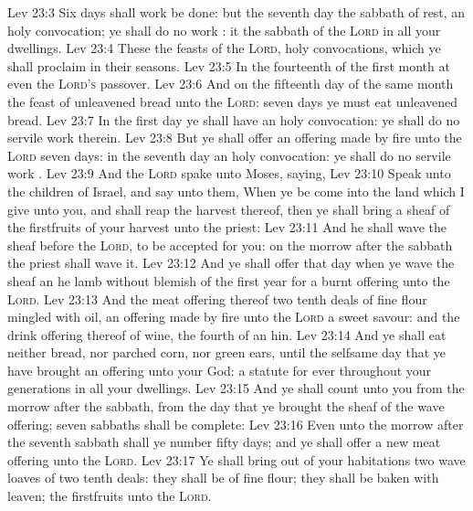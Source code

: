 \vs Lev 23:3 Six days shall work be done: but the seventh day  the sabbath of rest, an holy convocation; ye shall do no work : it  the sabbath of the \textsc{Lord} in all your dwellings.
\vs Lev 23:4 These  the feasts of the \textsc{Lord},  holy convocations, which ye shall proclaim in their seasons.
\vs Lev 23:5 In the fourteenth  of the first month at even  the \textsc{Lord's} passover.
\vs Lev 23:6 And on the fifteenth day of the same month  the feast of unleavened bread unto the \textsc{Lord}: seven days ye must eat unleavened bread.
\vs Lev 23:7 In the first day ye shall have an holy convocation: ye shall do no servile work therein.
\vs Lev 23:8 But ye shall offer an offering made by fire unto the \textsc{Lord} seven days: in the seventh day  an holy convocation: ye shall do no servile work .
\vs Lev 23:9 And the \textsc{Lord} spake unto Moses, saying,
\vs Lev 23:10 Speak unto the children of Israel, and say unto them, When ye be come into the land which I give unto you, and shall reap the harvest thereof, then ye shall bring a sheaf of the firstfruits of your harvest unto the priest:
\vs Lev 23:11 And he shall wave the sheaf before the \textsc{Lord}, to be accepted for you: on the morrow after the sabbath the priest shall wave it.
\vs Lev 23:12 And ye shall offer that day when ye wave the sheaf an he lamb without blemish of the first year for a burnt offering unto the \textsc{Lord}.
\vs Lev 23:13 And the meat offering thereof  two tenth deals of fine flour mingled with oil, an offering made by fire unto the \textsc{Lord}  a sweet savour: and the drink offering thereof  of wine, the fourth  of an hin.
\vs Lev 23:14 And ye shall eat neither bread, nor parched corn, nor green ears, until the selfsame day that ye have brought an offering unto your God:  a statute for ever throughout your generations in all your dwellings.
\vs Lev 23:15 And ye shall count unto you from the morrow after the sabbath, from the day that ye brought the sheaf of the wave offering; seven sabbaths shall be complete:
\vs Lev 23:16 Even unto the morrow after the seventh sabbath shall ye number fifty days; and ye shall offer a new meat offering unto the \textsc{Lord}.
\vs Lev 23:17 Ye shall bring out of your habitations two wave loaves of two tenth deals: they shall be of fine flour; they shall be baken with leaven;  the firstfruits unto the \textsc{Lord}.
